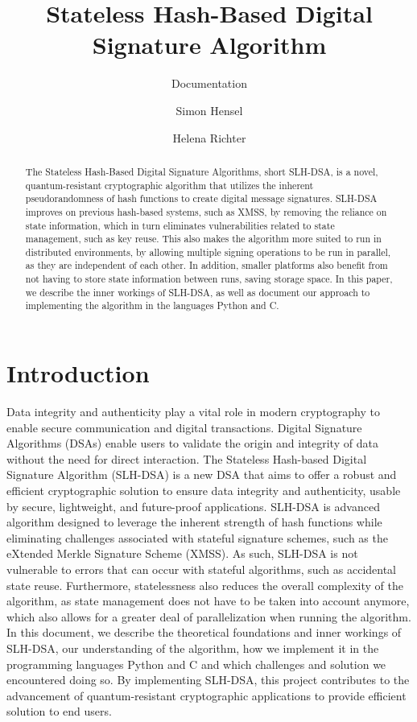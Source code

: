 \documentclass[journal=tosc,notanonymous]{iacrtrans}
\author{Simon Hensel\inst{1} \and Helena Richter\inst{2}}
\institute{Albstadt-Sigmaringen University, Albstadt, Germany, \email{hensels1@hs-albsig.de} \and
	Albstadt-Sigmaringen University, Albstadt, Germany, \email{richtehe@hs-albsig.de}}
\title{Stateless Hash-Based Digital Signature Algorithm}
\subtitle{Documentation}
\begin{document}
\maketitle




\begin{abstract}
  The Stateless Hash-Based Digital Signature Algorithms, short SLH-DSA, is a novel, quantum-resistant cryptographic algorithm that utilizes the inherent pseudorandomness of hash functions to create digital message signatures.
  SLH-DSA improves on previous hash-based systems, such as XMSS, by removing the reliance on state information, which in turn eliminates vulnerabilities related to state management, such as key reuse.
  This also makes the algorithm more suited to run in distributed environments, by allowing multiple signing operations to be run in parallel, as they are independent of each other.
  In addition, smaller platforms also benefit from not having to store state information between runs, saving storage space.
  In this paper, we describe the inner workings of SLH-DSA, as well as document our approach to implementing the algorithm in the languages Python and C.
\end{abstract}


\section{Introduction}

Data integrity and authenticity play a vital role in modern cryptography to enable secure communication and digital transactions.
Digital Signature Algorithms (DSAs) enable users to validate the origin and integrity of data without the need for direct interaction.
The Stateless Hash-based Digital Signature Algorithm (SLH-DSA) is a new DSA that aims to offer a robust and efficient cryptographic solution to ensure data integrity and authenticity, usable by secure, lightweight, and future-proof applications.
SLH-DSA is advanced algorithm designed to leverage the inherent strength of hash functions while eliminating challenges associated with stateful signature schemes, such as the eXtended Merkle Signature Scheme (XMSS).
As such, SLH-DSA is not vulnerable to errors that can occur with stateful algorithms, such as accidental state reuse.
Furthermore, statelessness also reduces the overall complexity of the algorithm, as state management does not have to be taken into account anymore, which also allows for a greater deal of parallelization when running the algorithm.
\\
In this document, we describe the theoretical foundations and inner workings of SLH-DSA, our understanding of the algorithm, how we implement it in the programming languages Python and C and which challenges and solution we encountered doing so.
By implementing SLH-DSA, this project contributes to the advancement of quantum-resistant cryptographic applications to provide efficient solution to end users.
\end{document}
